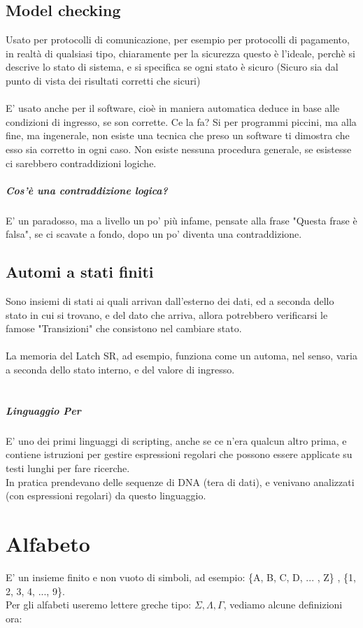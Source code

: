\documentclass[12pt, a4paper, openany, oneside]{book}
\begin{document}
\section{Model checking}
Usato per protocolli di comunicazione, per esempio per protocolli di pagamento,
in realtà di qualsiasi tipo, chiaramente per la sicurezza questo è l'ideale, 
perchè si descrive lo stato di sistema, e si specifica se ogni stato è sicuro
(Sicuro sia dal punto di vista dei risultati corretti che sicuri)
\\ \\
E' usato anche per il software, cioè in maniera automatica deduce in base alle
condizioni di ingresso, se son corrette. Ce la fa? Si per programmi piccini, 
ma alla fine, ma ingenerale, non esiste una tecnica che preso un software ti 
dimostra che esso sia corretto in ogni caso. Non esiste nessuna procedura generale,
se esistesse ci sarebbero contraddizioni logiche.
\paragraph{Cos'è una contraddizione logica?} 
E' un paradosso, ma a livello un po' più infame, pensate alla frase "Questa 
frase è falsa", se ci scavate a fondo, dopo un po' diventa una contraddizione.
\section{Automi a stati finiti}
Sono insiemi di stati ai quali arrivan dall'esterno dei dati, ed a seconda dello
stato in cui si trovano, e del dato che arriva, allora potrebbero verificarsi le
famose "Transizioni" che consistono nel cambiare stato.
\\ \\ 
La memoria del Latch SR, ad esempio, funziona come un automa, nel senso, varia
a seconda dello stato interno, e del valore di ingresso.
\\ \\
\paragraph{Linguaggio Per} E' uno dei primi linguaggi di scripting, anche se ce 
n'era qualcun altro prima, e contiene istruzioni per gestire espressioni regolari
che possono essere applicate su testi lunghi per fare ricerche.\\ 
In pratica prendevano delle sequenze di DNA (tera di dati), e venivano analizzati
(con espressioni regolari) da questo linguaggio.
\chapter{Alfabeto}
E' un insieme finito e non vuoto di simboli, ad esempio:
\{A, B, C, D, ... , Z\} , \{1, 2, 3, 4, ..., 9\}. \\ 
Per gli alfabeti useremo lettere greche tipo: $\Sigma, \Lambda, \Gamma$, vediamo
alcune definizioni ora:
\end{document}
